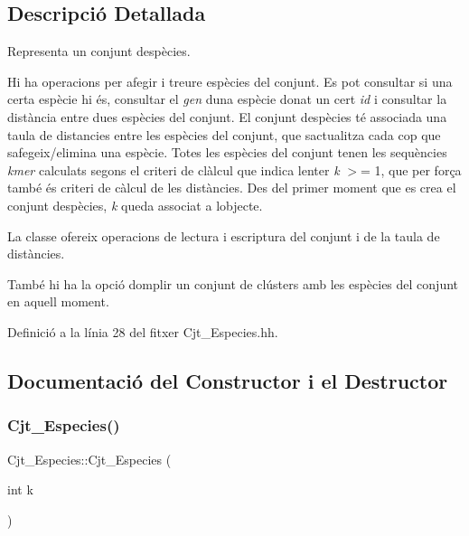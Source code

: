 \subsection{Descripció Detallada}
Representa un conjunt d\textquotesingle{}espècies. 

Hi ha operacions per afegir i treure espècies del conjunt. Es pot consultar si una certa espècie hi és, consultar el {\itshape gen} d\textquotesingle{}una espècie donat un cert {\itshape id} i consultar la distància entre dues espècies del conjunt. El conjunt d\textquotesingle{}espècies té associada una taula de distancies entre les espècies del conjunt, que s\textquotesingle{}actualitza cada cop que s\textquotesingle{}afegeix/elimina una espècie. Totes les espècies del conjunt tenen les sequències {\itshape kmer} calculats segons el criteri de clàlcul que indica l\textquotesingle{}enter {\itshape k} $>$= 1, que per força també és criteri de càlcul de les distàncies. Des del primer moment que es crea el conjunt d\textquotesingle{}espècies, {\itshape k} queda associat a l\textquotesingle{}objecte.

La classe ofereix operacions de lectura i escriptura del conjunt i de la taula de distàncies.

També hi ha la opció d\textquotesingle{}omplir un conjunt de clústers amb les espècies del conjunt en aquell moment. 

Definició a la línia 28 del fitxer Cjt\+\_\+\+Especies.\+hh.



\subsection{Documentació del Constructor i el Destructor}
\mbox{\label{class_cjt___especies_aeb3b22c649a5c8bfd3dfb66178c54338}} 
\subsubsection{\texorpdfstring{Cjt\+\_\+\+Especies()}{Cjt\_Especies()}}
{\footnotesize\ttfamily Cjt\+\_\+\+Especies\+::\+Cjt\+\_\+\+Especies (\begin{DoxyParamCaption}\item[{int}]{k }\end{DoxyParamCaption})}



